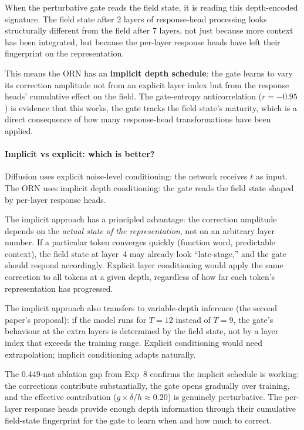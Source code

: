 \documentclass[11pt, a4paper]{article}
\theoremstyle{plain}
\theoremstyle{remark}
\begin{document}
When the perturbative gate reads the field state, it is reading this depth-encoded signature.
The field state after 2 layers of response-head processing looks structurally different from the field after 7 layers, not just because more context has been integrated, but because the per-layer response heads have left their fingerprint on the representation.

This means the ORN has an \textbf{implicit depth schedule}: the gate learns to vary its correction amplitude not from an explicit layer index but from the response heads' cumulative effect on the field.
The gate-entropy anticorrelation ($r = -0.95$) is evidence that this works, the gate tracks the field state's maturity, which is a direct consequence of how many response-head transformations have been applied.

\paragraph{Implicit vs explicit: which is better?}
Diffusion uses explicit noise-level conditioning: the network receives $t$ as input.
The ORN uses implicit depth conditioning: the gate reads the field state shaped by per-layer response heads.

The implicit approach has a principled advantage: the correction amplitude depends on the \emph{actual state of the representation}, not on an arbitrary layer number.
If a particular token converges quickly (function word, predictable context), the field state at layer~4 may already look ``late-stage,'' and the gate should respond accordingly.
Explicit layer conditioning would apply the same correction to all tokens at a given depth, regardless of how far each token's representation has progressed.

The implicit approach also transfers to variable-depth inference (the second paper's proposal): if the model runs for $T{=}12$ instead of $T{=}9$, the gate's behaviour at the extra layers is determined by the field state, not by a layer index that exceeds the training range.
Explicit conditioning would need extrapolation; implicit conditioning adapts naturally.

The 0.449-nat ablation gap from Exp~8 confirms the implicit schedule is working: the corrections contribute substantially, the gate opens gradually over training, and the effective contribution ($g \times \delta/h \approx 0.20$) is genuinely perturbative.
The per-layer response heads provide enough depth information through their cumulative field-state fingerprint for the gate to learn when and how much to correct.
\end{document}
